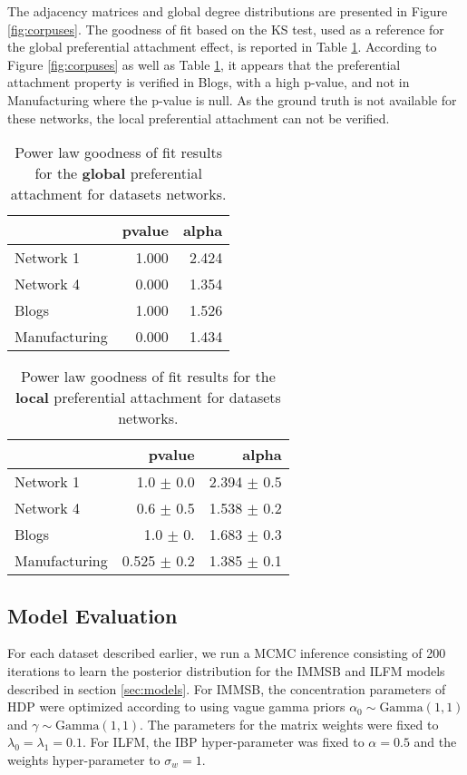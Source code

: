 The adjacency matrices and global degree distributions are presented in Figure \ref{fig:corpuses}. The goodness of fit based on the KS test, used as a reference for the global preferential attachment effect, is reported in Table \ref{table:synt_graph}. According to Figure \ref{fig:corpuses} as well as Table \ref{table:synt_graph}, it appears that the preferential attachment property is verified in Blogs, with a high p-value, and not in Manufacturing where the p-value is null. As the ground truth is not available for these networks, the local preferential attachment can not be verified.




\begin{table}[h]
    \caption{Power law goodness of fit results for the \textbf{global} preferential attachment for datasets networks.}
\centering
  \begin{tabular}{lrr}
  	\hline
  	&   pvalue &   alpha    \\
  	\hline
    Network 1     &    1.000 &   2.424 \\
    Network 4     &    0.000 &   1.354 \\
    Blogs         &    1.000 &   1.526 \\
    Manufacturing &    0.000 &   1.434 \\
  	\hline
  \end{tabular}
\label{table:synt_graph}
\end{table}

\begin{table}[h]
    \caption{Power law goodness of fit results for the \textbf{local} preferential attachment for datasets networks.}
\centering
    \begin{tabular}{lrr}
    \hline
    & pvalue          & alpha   \\
    \hline
    Network 1     &   1.0 $\pm$ 0.0  &  2.394 $\pm$ 0.5  \\
    Network 4     &   0.6 $\pm$ 0.5  &  1.538 $\pm$ 0.2  \\
    Blogs         &   1.0 $\pm$ 0.   &  1.683 $\pm$ 0.3  \\
    Manufacturing & 0.525 $\pm$ 0.2  &  1.385 $\pm$ 0.1  \\
    \hline
    \end{tabular}
\label{table:synt_graph_local}
\end{table}

\subsection{Model Evaluation}
For each dataset described earlier, we run a MCMC inference consisting of 200 iterations to learn the posterior distribution for the IMMSB and ILFM  models described in section \ref{sec:models}. For IMMSB, the concentration parameters of HDP were optimized according to  \cite{HDP} using vague gamma priors $\alpha_0 \sim \text{Gamma}(1,1)$ and $\gamma \sim \text{Gamma}(1,1)$. The parameters for the matrix weights were fixed to $\lambda_0=\lambda_1=0.1$. For ILFM, the IBP hyper-parameter was fixed to $\alpha=0.5$ and the weights hyper-parameter to $\sigma_w = 1$. 

